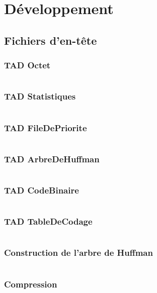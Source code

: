 \documentclass[10pt]{report}
\begin{document}
    \chapter{Développement}

        \section{Fichiers d'en-tête}
            \subsection{TAD Octet}
                \inputminted[breaklines]{c}{../include/octet.h}
            \subsection{TAD Statistiques}
                \inputminted[breaklines]{c}{../include/statistiques.h}
            \subsection{TAD FileDePriorite}
                \inputminted[breaklines]{c}{../include/fileDePrioriteDArbreDeHuffman.h}
            \subsection{TAD ArbreDeHuffman}
                \inputminted[breaklines]{c}{../include/arbreDeHuffman.h}
            \subsection{TAD CodeBinaire}
                \inputminted[breaklines]{c}{../include/codeBinaire.h}
            \subsection{TAD TableDeCodage}
                \inputminted[breaklines]{c}{../include/tableDeCodage.h}
            \subsection{Construction de l'arbre de Huffman}
                \inputminted[breaklines]{c}{../include/construireArbreDeHuffman.h}
            \subsection{Compression}
                \inputminted[breaklines]{c}{../include/compression.h}
\end{document}
